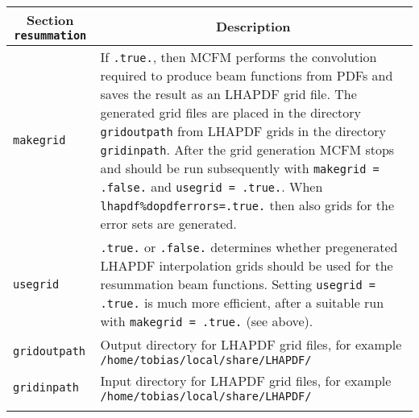 \begin{longtable}{p{1.5cm}p{12cm}}
		\hline
		\multicolumn{1}{c}{{\textbf{Section} \texttt{resummation}}} & \multicolumn{1}{c}{{\textbf{Description}}} \\ 
		\hline
\begin{minipage}[t]{0.24\columnwidth}\raggedright
\texttt{makegrid}\strut
\end{minipage} & \begin{minipage}[t]{0.71\columnwidth}\raggedright
If \texttt{.true.}, then MCFM performs
the convolution required to produce beam functions from PDFs and saves
the result as an LHAPDF grid file. The
generated grid files are placed in the directory \texttt{gridoutpath} from
LHAPDF grids in the directory \texttt{gridinpath}. After the grid
generation MCFM stops and should be run subsequently with
\texttt{makegrid = .false.} and \texttt{usegrid = .true.}. When
\texttt{lhapdf\%dopdferrors=.true.} then also grids for the error sets
are generated.\strut
\end{minipage}\tabularnewline
\begin{minipage}[t]{0.24\columnwidth}\raggedright
\texttt{usegrid}\strut
\end{minipage} & \begin{minipage}[t]{0.71\columnwidth}\raggedright
\texttt{.true.} or \texttt{.false.} determines whether pregenerated
LHAPDF interpolation grids should be used for the resummation beam
functions.  Setting \texttt{usegrid = .true.} is much more efficient,
after a suitable run with \texttt{makegrid = .true.} (see above).\strut
\end{minipage}\tabularnewline
\begin{minipage}[t]{0.24\columnwidth}\raggedright
\texttt{gridoutpath}\strut
\end{minipage} & \begin{minipage}[t]{0.71\columnwidth}\raggedright
Output directory for LHAPDF grid files, for example
\texttt{/home/tobias/local/share/LHAPDF/}\strut
\end{minipage}\tabularnewline
\begin{minipage}[t]{0.24\columnwidth}\raggedright
\texttt{gridinpath}\strut
\end{minipage} & \begin{minipage}[t]{0.71\columnwidth}\raggedright
Input directory for LHAPDF grid files, for example
\texttt{/home/tobias/local/share/LHAPDF/}\strut
\end{minipage}\tabularnewline
\begin{minipage}[t]{0.24\columnwidth}\raggedright

\end{minipage}
\end{longtable}
